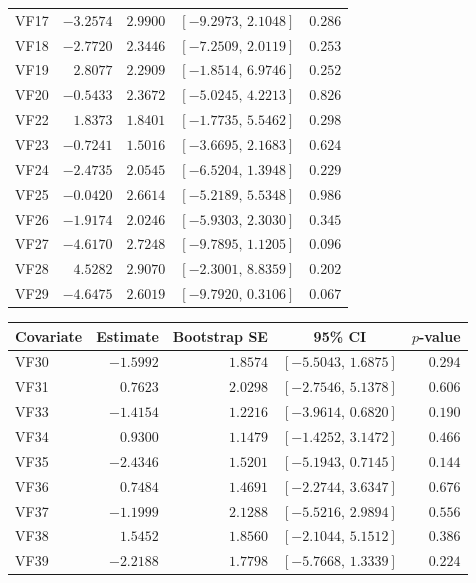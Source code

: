 \documentclass[10pt]{notes}
\begin{document}
\begin{landscape}
\begin{table}[p]
\begin{minipage}[t]{0.49\linewidth}
\begin{tabular}{lrrcr}
    VF17 & $-3.2574$ & $2.9900$ & $[-9.2973,\,2.1048]$ & $0.286$ \\
    VF18 & $-2.7720$ & $2.3446$ & $[-7.2509,\,2.0119]$ & $0.253$ \\
    VF19 & $2.8077$ & $2.2909$ & $[-1.8514,\,6.9746]$ & $0.252$ \\
    VF20 & $-0.5433$ & $2.3672$ & $[-5.0245,\,4.2213]$ & $0.826$ \\
    VF22 & $1.8373$ & $1.8401$ & $[-1.7735,\,5.5462]$ & $0.298$ \\
    VF23 & $-0.7241$ & $1.5016$ & $[-3.6695,\,2.1683]$ & $0.624$ \\
    VF24 & $-2.4735$ & $2.0545$ & $[-6.5204,\,1.3948]$ & $0.229$ \\
    VF25 & $-0.0420$ & $2.6614$ & $[-5.2189,\,5.5348]$ & $0.986$ \\
    VF26 & $-1.9174$ & $2.0246$ & $[-5.9303,\,2.3030]$ & $0.345$ \\
    VF27 & $-4.6170$ & $2.7248$ & $[-9.7895,\,1.1205]$ & $0.096$ \\
    VF28 & $4.5282$ & $2.9070$ & $[-2.3001,\,8.8359]$ & $0.202$ \\
    VF29 & $-4.6475$ & $2.6019$ & $[-9.7920,\,0.3106]$ & $0.067$ \\
    \hline
    \end{tabular}
    \end{minipage}
    \hfill
    \begin{minipage}[t]{0.49\linewidth}
    \centering
    \begin{tabular}{lrrcr}
    \hline
    Covariate & Estimate & Bootstrap SE & 95\% CI & $p$-value \\
    \hline
    VF30 & $-1.5992$ & $1.8574$ & $[-5.5043,\,1.6875]$ & $0.294$ \\
    VF31 & $0.7623$ & $2.0298$ & $[-2.7546,\,5.1378]$ & $0.606$ \\
    VF33 & $-1.4154$ & $1.2216$ & $[-3.9614,\,0.6820]$ & $0.190$ \\
    VF34 & $0.9300$ & $1.1479$ & $[-1.4252,\,3.1472]$ & $0.466$ \\
    VF35 & $-2.4346$ & $1.5201$ & $[-5.1943,\,0.7145]$ & $0.144$ \\
    VF36 & $0.7484$ & $1.4691$ & $[-2.2744,\,3.6347]$ & $0.676$ \\
    VF37 & $-1.1999$ & $2.1288$ & $[-5.5216,\,2.9894]$ & $0.556$ \\
    VF38 & $1.5452$ & $1.8560$ & $[-2.1044,\,5.1512]$ & $0.386$ \\
    VF39 & $-2.2188$ & $1.7798$ & $[-5.7668,\,1.3339]$ & $0.224$ \\

\end{tabular}
\end{minipage}
\end{table}
\end{landscape}
\end{document}
